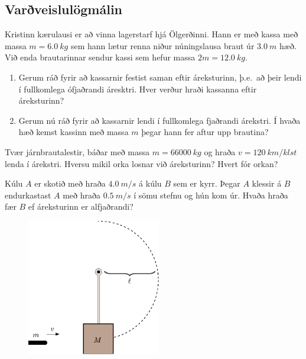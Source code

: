 \begin{enumerate}[label = \textbf{Dæmi \thechapter.\arabic*.}]
\begin{minipage}{\linewidth}
\subsection*{Varðveislulögmálin}

\item Kristinn kærulausi er að vinna lagerstarf hjá Ölgerðinni. Hann er með kassa með massa $m = \SI{6.0}{kg}$ sem hann lætur renna niður núningslausa braut úr $\SI{3.0}{m}$ hæð. Við enda brautarinnar sendur kassi sem hefur massa $2m = \SI{12.0}{kg}$.

\end{minipage}

\begin{enumerate}[label = \textbf{(\alph*)}]
    \item Gerum ráð fyrir að kassarnir festist saman eftir áreksturinn, þ.e.~að þeir lendi í fullkomlega ófjaðrandi áresktri. Hver verður hraði kassanna eftir áreksturinn?
    \item Gerum nú ráð fyrir að kassarnir lendi í fullkomlega fjaðrandi árekstri. Í hvaða hæð kemst kassinn með massa $m$ þegar hann fer aftur upp brautina?
\end{enumerate}

\item Tvær járnbrautalestir, báðar með massa $m = \SI{66000}{kg}$ og hraða $v = \SI{120}{km/klst}$ lenda í árekstri. Hversu mikil orka losnar við áreksturinn? Hvert fór orkan?

\item Kúlu $A$ er skotið með hraða $\SI{4.0}{m/s}$ á kúlu $B$ sem er kyrr. Þegar $A$ klessir á $B$ endurkastast $A$ með hraða $\SI{0,5}{m/s}$ í sömu stefnu og hún kom úr. Hvaða hraða fær $B$ ef áreksturinn er alfjaðrandi?

\vspace{0.5cm}


\begin{minipage}{\linewidth}
\begin{figure}
\centering
\vspace{-0.5cm}
\includegraphics[width=2.3in]{figures/pendullkula2.pdf}
   \label{fig:pendulkula}
\end{figure}


\end{minipage}
\end{enumerate}
